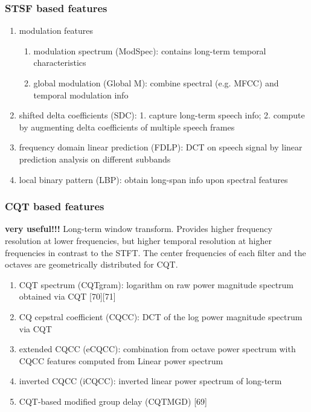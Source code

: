 \documentclass{article}
\begin{document}
\subsubsection{STSF based features}
\begin{enumerate}
    \item modulation features
    \begin{enumerate}
        \item modulation spectrum (ModSpec): contains long-term temporal characteristics
        \item global modulation (Global M): combine spectral (e.g. MFCC) and temporal modulation info
    \end{enumerate}
    \item shifted delta coefficients (SDC): 1. capture long-term speech info; 2. compute by augmenting delta coefficients of multiple speech frames
    \item frequency domain linear prediction (FDLP): DCT on speech signal by linear prediction analysis on different subbands
    \item local binary pattern (LBP): obtain long-span info upon spectral features
\end{enumerate}

\subsubsection{CQT based features}
\textbf{very useful!!!}
Long-term window transform. Provides higher frequency resolution at lower frequencies, but higher temporal resolution at higher frequencies in contrast to the STFT. The center frequencies of each filter and the octaves are geometrically distributed for CQT. 

\begin{enumerate}
    \item CQT spectrum (CQTgram): logarithm on raw power magnitude spectrum obtained via CQT [70][71]
    \item CQ cepstral coefficient (CQCC): DCT of the log power magnitude spectrum via CQT
    \item extended CQCC (eCQCC): combination from octave power spectrum with CQCC features computed from Linear power spectrum
    \item inverted CQCC (iCQCC): inverted linear power spectrum of long-term
    \item CQT-based modified group delay (CQTMGD) [69]
\end{enumerate}
\end{document}

